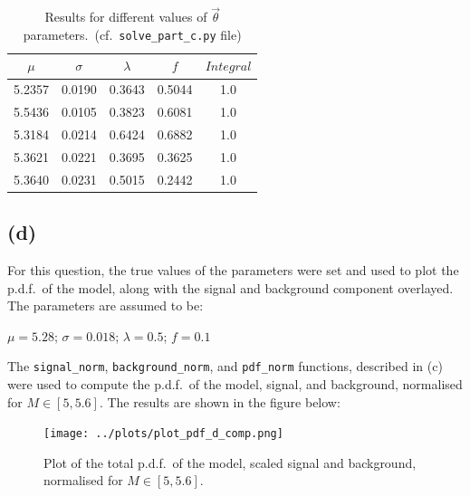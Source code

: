 \documentclass[12pt]{report} %
\begin{document}
\begin{center}
    \begin{table}[htbp]
        \begin{tabular}{ |c|c|c|c|c| } 
            \hline
            $\mu$ & $\sigma$ & $\lambda$ & $f$ & $Integral$ \\ 
            \hline
            5.2357 & 0.0190 & 0.3643 & 0.5044 & 1.0 \\ 
            \hline
            5.5436 & 0.0105 & 0.3823 & 0.6081 & 1.0 \\ 
            \hline
            5.3184 & 0.0214 & 0.6424 & 0.6882 & 1.0 \\ 
            \hline
            5.3621 & 0.0221 & 0.3695 & 0.3625 & 1.0 \\ 
            \hline
            5.3640 & 0.0231 & 0.5015 & 0.2442 & 1.0 \\ 
            \hline
        \end{tabular}
        \centering
        \caption{Results for different values of $\vec{\theta}$ parameters.\ (cf.\ \texttt{solve\_part\_c.py} file)}
    \end{table}
\end{center}

\subsection*{(d)}

For this question, the true values of the parameters were set and used to plot the p.d.f.\ of the model, along with the signal and background component overlayed. The parameters are assumed to be:

\begin{center}
    $\mu = 5.28$;  
    $\sigma = 0.018$; 
    $\lambda = 0.5$; 
    $f = 0.1$
\end{center}

The \texttt{signal\_norm}, \texttt{background\_norm}, and \texttt{pdf\_norm} functions, described in (c) were used to compute the p.d.f.\ of the model, signal, and background, normalised for $M\in{[5,5.6]}$. The results are shown in the figure below:

\newpage

\begin{figure}[htbp]
    \centering
    \texttt{[image: ../plots/plot\_pdf\_d\_comp.png]}
    \captionsetup{margin=1.3cm}
    \caption[width=0.2\pdfpagewidth]{Plot of the total p.d.f.\ of the model, scaled signal and background, normalised for $M\in{[5,5.6]}$.}
\end{figure}  
\end{document}
